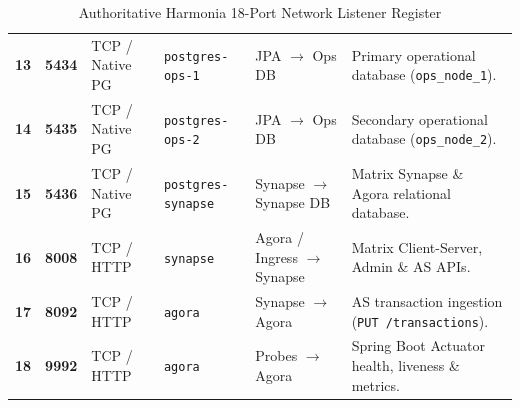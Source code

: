 \begin{table}[htbp]
\begin{tabularx}{\textwidth}{c l P{2.2cm} P{2.8cm} P{2.6cm} Y}
\textbf{13} & \textbf{5434} & TCP / Native PG & \nolinkurl{postgres-ops-1} & JPA $\rightarrow$ Ops DB & Primary operational database (\nolinkurl{ops_node_1}). \\
\textbf{14} & \textbf{5435} & TCP / Native PG & \nolinkurl{postgres-ops-2} & JPA $\rightarrow$ Ops DB & Secondary operational database (\nolinkurl{ops_node_2}). \\
\textbf{15} & \textbf{5436} & TCP / Native PG & \nolinkurl{postgres-synapse} & Synapse $\rightarrow$ Synapse DB & Matrix Synapse \& Agora relational database. \\
\textbf{16} & \textbf{8008} & TCP / HTTP & \nolinkurl{synapse} & Agora / Ingress $\rightarrow$ Synapse & Matrix Client-Server, Admin \& AS APIs. \\
\textbf{17} & \textbf{8092} & TCP / HTTP & \nolinkurl{agora} & Synapse $\rightarrow$ Agora & AS transaction ingestion (\nolinkurl{PUT /transactions}). \\
\textbf{18} & \textbf{9992} & TCP / HTTP & \nolinkurl{agora} & Probes $\rightarrow$ Agora & Spring Boot Actuator health, liveness \& metrics. \\
\bottomrule
\end{tabularx}
\caption{Authoritative Harmonia 18-Port Network Listener Register}
\label{tab:port_protocol_register}
\end{table}

\newpage
